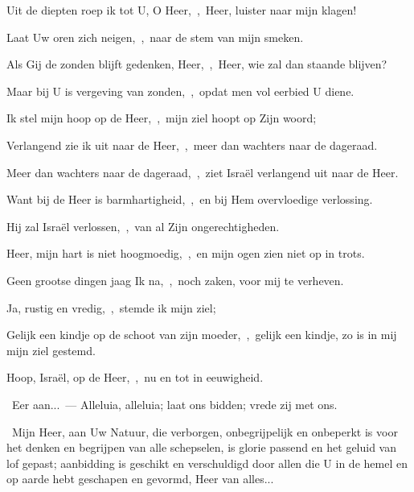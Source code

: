 \documentclass[12pt,twoside,a5paper]{article}
\begin{document}

\begin{halfparskip}

  Uit de diepten roep ik tot U, O Heer,~\sep\ Heer, luister naar mijn klagen!

  Laat Uw oren zich neigen,~\sep\ naar de stem van mijn smeken.

  Als Gij de zonden blijft gedenken, Heer,~\sep\ Heer, wie zal dan staande blijven?

  Maar bij U is vergeving van zonden,~\sep\ opdat men vol eerbied U diene.
\end{halfparskip}

\begin{halfparskip}

  Ik stel mijn hoop op de Heer,~\sep\ mijn ziel hoopt op Zijn woord;

  Verlangend zie ik uit naar de Heer,~\sep\ meer dan wachters naar de dageraad.

  Meer dan wachters naar de dageraad,~\sep\ ziet Israël verlangend uit naar de Heer.

  Want bij de Heer is barmhartigheid,~\sep\ en bij Hem overvloedige verlossing.

  Hij zal Israël verlossen,~\sep\ van al Zijn ongerechtigheden.
\end{halfparskip}


\begin{halfparskip}
  Heer, mijn hart is niet hoogmoedig,~\sep\ en mijn ogen zien niet op in trots.

  Geen grootse dingen jaag Ik na,~\sep\ noch zaken, voor mij te verheven.

  Ja, rustig en vredig,~\sep\ stemde ik mijn ziel;

  Gelijk een kindje op de schoot van zijn moeder,~\sep\ gelijk een kindje, zo is in mij mijn ziel gestemd.

  Hoop, Israël, op de Heer,~\sep\ nu en tot in eeuwigheid.
\end{halfparskip}


\begin{halfparskip}
  \dd~Eer aan...~--- Alleluia, alleluia; laat ons bidden; vrede zij met ons.

  \cc~Mijn Heer, aan Uw Natuur, die verborgen, onbegrijpelijk en onbeperkt is voor het denken en begrijpen van alle schepselen, is glorie passend en het geluid van lof gepast; aanbidding is geschikt en verschuldigd door allen die U in de hemel en op aarde hebt geschapen en gevormd, Heer van alles...
\end{halfparskip}
\end{document}

